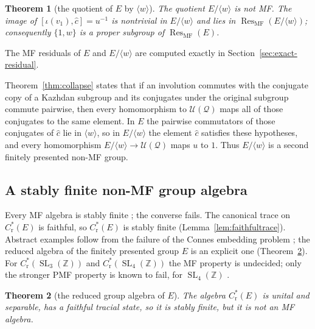 \documentclass[11pt]{amsart}
\newcommand{\leanverified}[2]{\ignorespaces}
\theoremstyle{definition}
\theoremstyle{remark}
\theoremstyle{plain}
\newtheorem{mainthm}{Theorem}
\newcommand{\SL}{\operatorname{SL}}
\newcommand{\U}{\mathcal U}
\newcommand{\Cred}{C^*_{\mathrm r}}
\begin{document}
\begin{mainthm}[the quotient of $E$ by $\langle w\rangle$]\label{thm:signfree}
The quotient $E/\langle w\rangle$ is not MF\@.  The image of
$[\iota(v_1),\hat c]=u^{-1}$ is nontrivial in $E/\langle w\rangle$ and lies
in $\operatorname{Res}_{\mathrm{MF}}(E/\langle w\rangle)$; consequently
$\{1,w\}$ is a proper subgroup of
$\operatorname{Res}_{\mathrm{MF}}(E)$.
\leanverified{Sofic/LiteralSignFreeQuotient}{GroupApproximation.LiteralSignFreeQuotient.signFree_collapse}
\leanverified{Sofic/LiteralSignFreeQuotient}{GroupApproximation.LiteralSignFreeQuotient.signFreeQuotient_not_isCDEOperatorMF}
\leanverified{Sofic/LiteralSignFreeQuotient}{GroupApproximation.LiteralSignFreeQuotient.commutator_not_zpow_mark}
\end{mainthm}

The MF residuals of $E$ and $E/\langle w\rangle$ are computed exactly in
Section~\ref{sec:exact-residual}.

\noindent
Theorem~\ref{thm:collapse} states that if an involution commutes with the
conjugate copy of a Kazhdan subgroup and its conjugates under the
original subgroup commute pairwise, then every homomorphism to
$\U(\mathcal Q)$ maps all of those conjugates to the same element.
In $E$ the pairwise commutators of those conjugates of $\hat c$ lie in
$\langle w\rangle$, so in $E/\langle w\rangle$ the element $\hat c$
satisfies these hypotheses, and every homomorphism
$E/\langle w\rangle\to\U(\mathcal Q)$ maps $u$ to $1$.  Thus
$E/\langle w\rangle$ is a second finitely presented non-MF group.

\subsection*{A stably finite non-MF group algebra}
Every MF algebra is stably finite \cite{BK}; the converse fails.  The
canonical trace on $\Cred(E)$ is faithful, so $\Cred(E)$ is stably
finite (Lemma~\ref{lem:faithfultrace}).
Abstract examples follow from the failure of the Connes embedding
problem \cite{FGH}; the reduced algebra of the finitely presented group
$E$ is an explicit one (Theorem~\ref{thm:reduced}).  For
$\Cred(\SL_3(\mathbb Z))$ and $\Cred(\SL_4(\mathbb Z))$ the MF
property is undecided; only the stronger PMF property is known to
fail, for $\SL_4(\mathbb Z)$ \cite{MdlS}.

\begin{mainthm}[the reduced group algebra of $E$]\label{thm:reduced}
The algebra $\Cred(E)$ is unital and separable, has a faithful
tracial state, so it is stably finite, but it is not an MF
algebra.
\leanverified{Sofic/LiteralNonMFEndpoint}{GroupApproximation.LiteralNonMFEndpoint.manuscriptTheoremD}
\end{mainthm}
\end{document}
